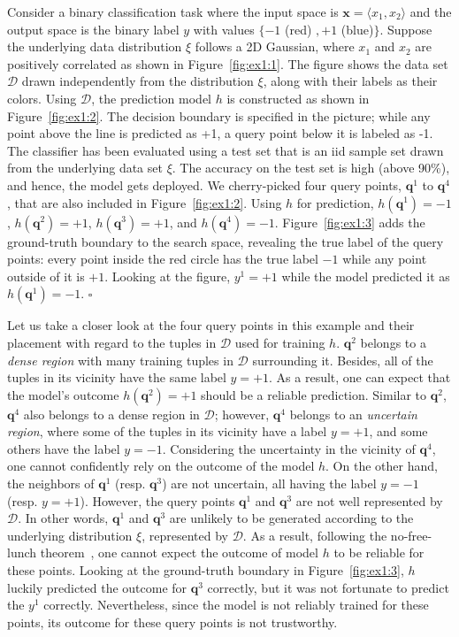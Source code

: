 \documentclass[11pt]{article}
\newcommand{\dee}{\mathcal{D}}
\newcommand{\dist}{\xi}
\newcommand{\qu}{\mathbf{q}}
\newcommand{\ex}{\mathbf{x}}
\begin{document}
\vspace{1mm}
\begin{example}\label{ex-1}
Consider a binary classification task where the input space is $\ex=\langle x_1, x_2\rangle$ and the output space is the binary label $y$ with values $\{-1$ (red) $,+1$ (blue)$\}$.
Suppose the underlying data distribution $\dist$ follows a 2D Gaussian, where $x_1$ and $x_2$ 
are positively correlated as shown in Figure~\ref{fig:ex1:1}.
The figure shows the data set $\dee$ drawn independently from the distribution $\dist$, along with their labels as their colors.
Using $\dee$, the prediction model $h$ is constructed as shown in Figure~\ref{fig:ex1:2}. 
The decision boundary is specified in the picture; while any point above the line is predicted as +1, a query point below it is labeled as -1.
The classifier has been evaluated using a test set that is an iid sample set drawn from the underlying data set $\dist$. The accuracy on the test set is high (above 90\%), and hence, the model gets deployed.
We cherry-picked four query points, $\qu^1$ to $\qu^4$, that are also included in Figure~\ref{fig:ex1:2}. Using $h$ for prediction, $h(\qu^1)=-1$, $h(\qu^2)=+1$,  $h(\qu^3)=+1$, and $h(\qu^4)=-1$.
Figure~\ref{fig:ex1:3} adds the ground-truth boundary to the search space, revealing the true label of the query points: every point inside the red circle has the true label $-1$ while any point outside of it is $+1$.
Looking at the figure, $y^1=+1$ while the model predicted it as $h(\qu^1)=-1$.  \hfill$\square$
\end{example}
\vspace{2mm}

Let us take a closer look at the four query points in this example and their placement with regard to the tuples in $\dee$ used for training $h$. 
$\qu^2$ belongs to a {\it dense region} with many training tuples in $\dee$ surrounding it. Besides, all of the tuples in its vicinity have the same label $y=+1$. As a result, one can expect that the model's outcome $h(\qu^2)=+1$ should be a reliable prediction.
Similar to $\qu^2$, $\qu^4$ also belongs to a dense region in $\dee$; however, $\qu^4$ belongs to an {\it uncertain region}, where some of the tuples in its vicinity have a label $y=+1$, and some others have the label $y=-1$. Considering the uncertainty in the vicinity of $\qu^4$, one cannot confidently rely on the outcome of the model $h$. 
On the other hand, the neighbors of $\qu^1$ (resp. $\qu^3$) are not uncertain, all having the label $y=-1$ (resp. $y=+1$).
However, the query points $\qu^1$ and $\qu^3$ are not well represented by $\dee$. In other words, $\qu^1$ and $\qu^3$ are unlikely to be generated according to the underlying distribution $\dist$, represented by $\dee$. As a result, following the no-free-lunch theorem~\cite{kakade2003sample}, one cannot expect the outcome of model $h$ to be reliable for these points.
Looking at the ground-truth boundary in Figure~\ref{fig:ex1:3}, $h$ luckily predicted the outcome for $\qu^3$ correctly, but it was not fortunate to predict the $y^1$ correctly.
Nevertheless, 
since the model is not reliably trained for these points, 
its outcome for these query points is not trustworthy.
\end{document}
